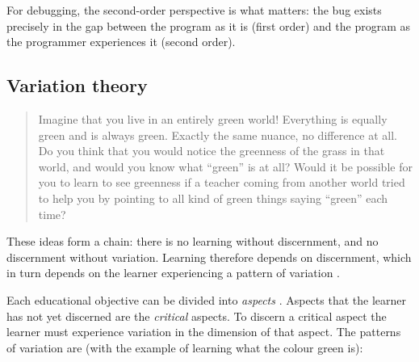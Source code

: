 For debugging, the second-order perspective is what matters: the bug exists
precisely in the gap between the program as it is (first order) and the
program as the programmer experiences it (second order).

\subsection{Variation theory}

\begin{frame}
  \blockcquote[p.~44]{NCOL}{%
    Imagine that you live in an entirely green world!
    Everything is equally green and is always green.
    Exactly the same nuance, no difference at all.
    Do you think that you would notice the greenness of the grass in that
    world, and would you know what \enquote{green} is at all?
    \textelp{}
    Would it be possible for you to learn to see greenness if a teacher coming
    from another world tried to help you by pointing to all kind of green
    things \textelp{} saying \enquote{green} each time?%
  }
\end{frame}

These ideas form a chain: there is no learning without discernment, and no
discernment without variation. Learning therefore depends on discernment, which
in turn depends on the learner experiencing a pattern of variation
\autocites[Ch.~3]{NCOL}{VariationTheory}.


Each educational objective can be divided into \emph{aspects}
\autocite[Ch.~2]{NCOL}.
Aspects that the learner has not yet discerned are the \emph{critical}
aspects.
To discern a critical aspect the learner must experience variation in the
dimension of that aspect.
The patterns of variation are (with the example of learning what the colour
green is):


